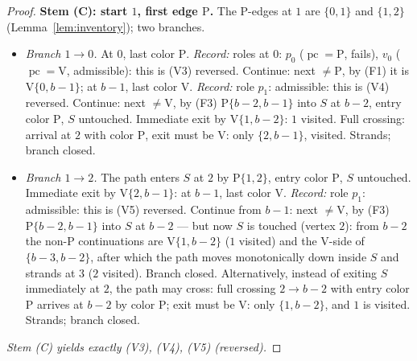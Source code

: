 \documentclass[11pt]{article}
\theoremstyle{definition}
\DeclareMathOperator{\pc}{pc}
\begin{document}
\begin{proof}
\medskip
\noindent\textbf{Stem (C): start $1$, first edge $\mathrm P$.}
The P-edges at $1$ are $\{0,1\}$ and $\{1,2\}$ (Lemma~\ref{lem:inventory}); two
branches.
\begin{itemize}
\item \emph{Branch $1 \to 0$.} At $0$, last color $\mathrm P$. \emph{Record:} roles
at $0$: $p_0$ ($\pc = \mathrm P$, fails), $v_0$ ($\pc = \mathrm V$, admissible):
this is (V3) reversed. Continue: next $\ne \mathrm P$, by (F1) it is
$\mathrm V\{0, b-1\}$; at $b-1$, last color $\mathrm V$. \emph{Record:} role $p_1$:
admissible: this is (V4) reversed. Continue: next $\ne \mathrm V$, by (F3)
$\mathrm P\{b-2,b-1\}$ into $S$ at $b-2$, entry color $\mathrm P$, $S$ untouched.
Immediate exit by $\mathrm V\{1,b-2\}$: $1$ visited. Full crossing: arrival at $2$
with color $\mathrm P$, exit must be $\mathrm V$: only $\{2,b-1\}$, visited.
Strands; branch closed.
\item \emph{Branch $1 \to 2$.} The path enters $S$ at $2$ by $\mathrm P\{1,2\}$,
entry color $\mathrm P$, $S$ untouched. Immediate exit by $\mathrm V\{2, b-1\}$: at
$b-1$, last color $\mathrm V$. \emph{Record:} role $p_1$: admissible: this is (V5)
reversed. Continue from $b-1$: next $\ne \mathrm V$, by (F3) $\mathrm P\{b-2,b-1\}$
into $S$ at $b-2$ --- but now $S$ is touched (vertex $2$): from $b-2$ the
non-$\mathrm P$ continuations are $\mathrm V\{1,b-2\}$ ($1$ visited) and the V-side
of $\{b-3,b-2\}$, after which the path moves monotonically down inside $S$ and
strands at $3$ ($2$ visited). Branch closed. Alternatively, instead of exiting $S$
immediately at $2$, the path may cross: full crossing $2 \to b-2$ with entry color
$\mathrm P$ arrives at $b-2$ by color $\mathrm P$; exit must be $\mathrm V$: only
$\{1, b-2\}$, and $1$ is visited. Strands; branch closed.
\end{itemize}
\emph{Stem (C) yields exactly (V3), (V4), (V5) (reversed).}


\end{proof}
\end{document}
